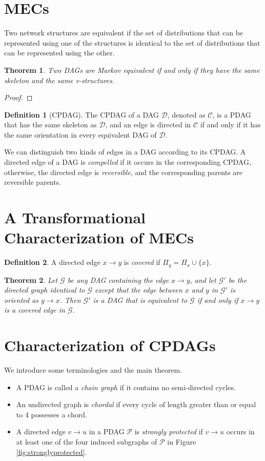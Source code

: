 \documentclass{article}
\newtheorem{theorem}{Theorem}[section]
\theoremstyle{definition}
\newtheorem{definition}{Definition}[section]
\newcommand{\cC}{\mathcal{C}}
\newcommand{\cD}{\mathcal{D}}
\newcommand{\cG}{\mathcal{G}}
\newcommand{\cP}{\mathcal{P}}
\newcommand{\<}{\left\langle}
\renewcommand{\>}{\right\rangle}
\begin{document}
\section{MECs}

Two network structures are equivalent if the set of distributions that can be represented using one of the structures is identical to the set of distributions that can be represented using the other.
\begin{theorem}\label{thm:verma}
    Two DAGs are Markov equivalent if and only if they have the same skeleton and the same v-structures.
\end{theorem}
\begin{proof}
    
\end{proof}


\begin{definition}[CPDAG]
    The CPDAG of a DAG $\cD$, denoted as $\cC$, is a PDAG that has the same skeleton as $\cD$, and an edge is directed in $\cC$ if and only if it has the same orientation in every equivalent DAG of $\cD$.
\end{definition}
We can distinguish two kinds of edges in a DAG according to its CPDAG. A directed edge of a DAG is \textit{compelled} if it occurs in the corresponding CPDAG, otherwise, the directed edge is \textit{reversible}, and the corresponding parents are reversible parents.

\section{A Transformational Characterization of MECs}
\begin{definition}
    A directed edge $x\rightarrow y$ is \textit{covered} if $\Pi_{y}=\Pi_{x}\cup\{x\}$.
\end{definition}

\begin{theorem}\label{thm:transformational}
    Let $\cG$ be any DAG containing the edge $x \rightarrow y$, and let $\cG'$ be the directed graph identical to $\cG$ except that the edge between $x$ and $y$ in $\cG'$ is oriented as $y\rightarrow x$. Then $\cG'$ is a DAG that is equivalent to $\cG$ if and only if $x\rightarrow y$ is a covered edge in $\cG$.
\end{theorem}


\section{Characterization of CPDAGs}
We introduce some terminologies and the main theorem.
\begin{itemize}
    \item A PDAG is called a \textit{chain graph} if it contains no semi-directed cycles.
    \item An undirected graph is \textit{chordal} if every cycle of length greater than or equal to 4 possesses a chord.
    \item A directed edge $v\rightarrow u$ in a PDAG $\cP$ is \textit{strongly protected} if $v\rightarrow u$ occurs in at least one of the four induced subgraphs of $\cP$ in Figure \ref{fig:stronglyprotected}.
\end{itemize}
\end{document}
